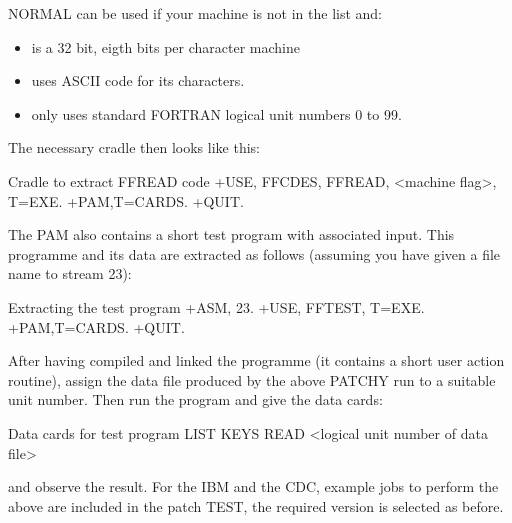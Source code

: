 NORMAL can be used if your machine is not in the list and:

\begin{itemize} 
\item
is a 32 bit, eigth bits per character machine
\item
uses ASCII code for its characters.
\item
only uses standard FORTRAN logical unit numbers 0 to 99.
\end{itemize}
 
The necessary cradle then looks like this:
 
\begin{XMPt}{Cradle to extract FFREAD code}
+USE, FFCDES, FFREAD, <machine flag>, T=EXE.
+PAM,T=CARDS.
+QUIT.
\end{XMPt}
 
The PAM also contains a short test program with associated input.
This programme and its data are extracted as follows (assuming you have
given a file name to stream 23):
 
\begin{XMPt}{Extracting the test program}
+ASM, 23.
+USE, FFTEST, T=EXE.
+PAM,T=CARDS.
+QUIT.
\end{XMPt}
 
After having compiled and linked the programme (it contains a short user
action routine), assign the data file produced by the above PATCHY run to
a suitable unit number. Then run the program and give the data cards:
 
\begin{XMPt}{Data cards for test program}
LIST
KEYS
READ <logical unit number of data file>
\end{XMPt}
 
and observe the result.
For the IBM and the CDC, example jobs to perform the above are included
in the patch TEST, the required version is selected as before.
